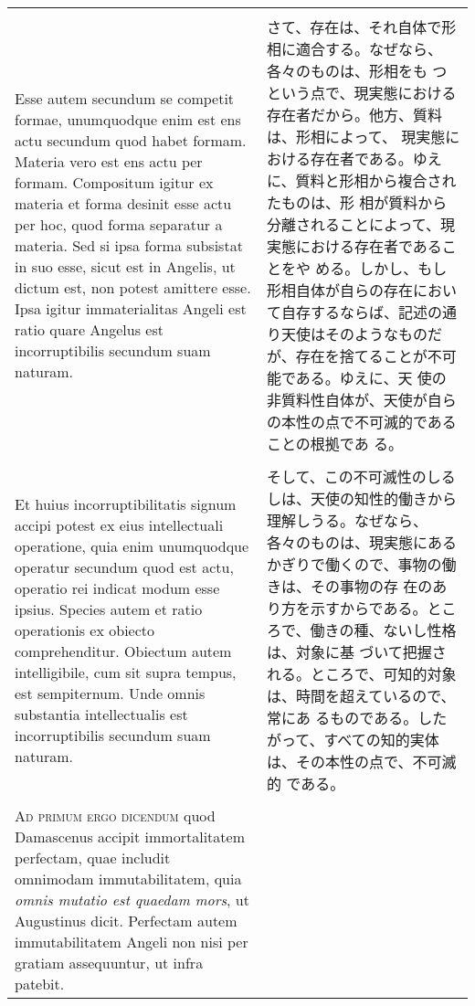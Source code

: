 \documentclass[10pt]{jsarticle} %
\begin{document}
\begin{longtable}{p{21em}p{21em}}
\\\\

Esse
autem secundum se competit formae, unumquodque enim est ens actu
secundum quod habet formam. Materia vero est ens actu per
formam. Compositum igitur ex materia et forma desinit esse actu per hoc,
quod forma separatur a materia. Sed si ipsa forma subsistat in suo esse,
sicut est in Angelis, ut dictum est, non potest amittere esse. Ipsa
igitur immaterialitas Angeli est ratio quare Angelus est incorruptibilis
secundum suam naturam. 



&

さて、存在は、それ自体で形相に適合する。なぜなら、各々のものは、形相をも
 つという点で、現実態における存在者だから。他方、質料は、形相によって、
 現実態における存在者である。ゆえに、質料と形相から複合されたものは、形
 相が質料から分離されることによって、現実態における存在者であることをや
 める。しかし、もし形相自体が自らの存在において自存するならば、記述の通
 り天使はそのようなものだが、存在を捨てることが不可能である。ゆえに、天
 使の非質料性自体が、天使が自らの本性の点で不可滅的であることの根拠であ
 る。

\\\\





Et huius incorruptibilitatis signum accipi potest
ex eius intellectuali operatione, quia enim unumquodque operatur
secundum quod est actu, operatio rei indicat modum esse ipsius. Species
autem et ratio operationis ex obiecto comprehenditur. Obiectum autem
intelligibile, cum sit supra tempus, est sempiternum. Unde omnis
substantia intellectualis est incorruptibilis secundum suam naturam.


&


そして、この不可滅性のしるしは、天使の知性的働きから理解しうる。なぜなら、
 各々のものは、現実態にあるかぎりで働くので、事物の働きは、その事物の存
 在のあり方を示すからである。ところで、働きの種、ないし性格は、対象に基
 づいて把握される。ところで、可知的対象は、時間を超えているので、常にあ
 るものである。したがって、すべての知的実体は、その本性の点で、不可滅的
 である。

\\\\


{\scshape Ad primum ergo dicendum} quod Damascenus accipit
immortalitatem perfectam, quae includit omnimodam immutabilitatem, quia
{\itshape omnis mutatio est quaedam mors}, ut Augustinus
dicit. Perfectam autem immutabilitatem Angeli non nisi per gratiam
assequuntur, ut infra patebit.


\end{longtable}
\end{document}
